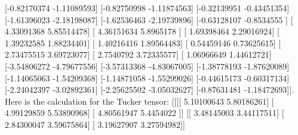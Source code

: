 \documentclass{article}%
\begin{document}
 {[}{-}0.82170374 {-}1.11089593{]}\newline%
 {[}{-}0.82750998 {-}1.11874563{]}\newline%
 {[}{-}0.32139951 {-}0.43451354{]}\newline%
 {[}{-}1.61396023 {-}2.18198087{]}\newline%
 {[}{-}1.62536463 {-}2.19739896{]}\newline%
 {[}{-}0.63128107 {-}0.8534555 {]}\newline%
 {[} 4.33091368  5.85514478{]}\newline%
 {[} 4.36151634  5.8965178 {]}\newline%
 {[} 1.69398464  2.29016924{]}\newline%
 {[} 1.39232585  1.88234401{]}\newline%
 {[} 1.40216416  1.89564483{]}\newline%
 {[} 0.54459146  0.73625615{]}\newline%
 {[} 2.73475515  3.69723077{]}\newline%
 {[} 2.7540792   3.72335577{]}\newline%
 {[} 1.06966649  1.44612721{]}\newline%
 {[}{-}3.54806272 {-}4.79677556{]}\newline%
 {[}{-}3.57313368 {-}4.83067005{]}\newline%
 {[}{-}1.38778193 {-}1.87620089{]}\newline%
 {[}{-}1.14065063 {-}1.54209368{]}\newline%
 {[}{-}1.14871058 {-}1.55299026{]}\newline%
 {[}{-}0.44615173 {-}0.60317134{]}\newline%
 {[}{-}2.24042397 {-}3.02892361{]}\newline%
 {[}{-}2.25625502 {-}3.05032627{]}\newline%
 {[}{-}0.87631481 {-}1.18472693{]}{]}.\newline%
%
Here is the calculation for the Tucker tensor: {[}{[}{[}{[} 5.10100643  5.80186261{]}\newline%
   {[} 4.99129859  5.53890968{]}\newline%
   {[} 4.80561947  5.4454022 {]}{]}\newline%
\newline%
  {[}{[} 3.48145003  3.44117511{]}\newline%
   {[} 2.84300047  3.59675864{]}\newline%
   {[} 3.19627907  3.27594982{]}{]}\newline%
\newline%
\end{document}
